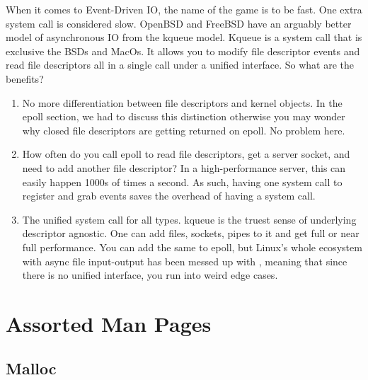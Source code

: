 When it comes to Event-Driven IO, the name of the game is to be fast.
One extra system call is considered slow.
OpenBSD and FreeBSD have an arguably better model of asynchronous IO from the kqueue model.
Kqueue is a system call that is exclusive the BSDs and MacOs.
It allows you to modify file descriptor events and read file descriptors all in a single call under a unified interface.
So what are the benefits?

\begin{enumerate}
\item No more differentiation between file descriptors and kernel objects. In the epoll section, we had to discuss this distinction otherwise you may wonder why closed file descriptors are getting returned on epoll. No problem here.
\item How often do you call epoll to read file descriptors, get a server socket, and need to add another file descriptor?
  In a high-performance server, this can easily happen 1000s of times a second.
  As such, having one system call to register and grab events saves the overhead of having a system call.
\item The unified system call for all types.
  kqueue is the truest sense of underlying descriptor agnostic.
  One can add files, sockets, pipes to it and get full or near full performance.
  You can add the same to epoll, but Linux's whole ecosystem with async file input-output has been messed up with , meaning that since there is no unified interface, you run into weird edge cases.
\end{enumerate}



\section{Assorted Man Pages}

\subsection{Malloc}\label{man_malloc}

